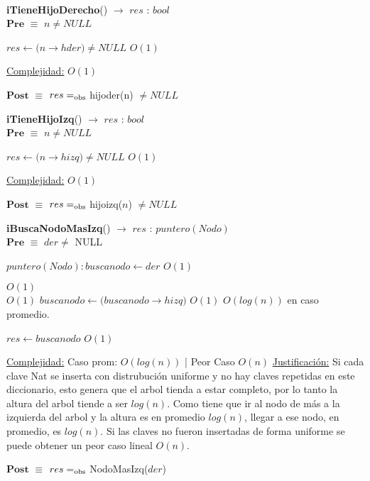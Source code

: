 ~


\begin{algorithm}[H]{\textbf{iTieneHijoDerecho}() $\to$ $res$ : $bool$}
	{\\ $\textbf{Pre}$ $\equiv$ $n \neq NULL$}
	\begin{algorithmic}[1]

		\State $res \gets (n$$\rightarrow$$hder) \neq NULL$ \Comment $O(1)$

		\medskip
		\Statex \underline{Complejidad:} $O(1)$

    \end{algorithmic}
    {$\textbf{Post}$ $\equiv$ $res =_{\mathrm{obs}}$ hijoder(n) $\neq NULL$}
\end{algorithm}


\begin{algorithm}[H]{\textbf{iTieneHijoIzq}() $\to$ $res$ : $bool$}
	{\\ $\textbf{Pre}$ $\equiv$ $n \neq NULL$}
	\begin{algorithmic}[1]

		\State $res \gets (n$$\rightarrow$$hizq) \neq NULL$ \Comment $O(1)$

		\medskip
		\Statex \underline{Complejidad:} $O(1)$

    \end{algorithmic}
    {$\textbf{Post}$ $\equiv$ $res =_{\mathrm{obs}}$ hijoizq($n$) $\neq NULL$}
\end{algorithm}


\begin{algorithm}[H]{\textbf{iBuscaNodoMasIzq}() $\to$ $res$ : $puntero(Nodo)$}
	{\\ $\textbf{Pre}$ $\equiv$ $der \neq$ NULL}
	\begin{algorithmic}[1]

		\State $puntero(Nodo): buscanodo \gets der$ \Comment $O(1)$

		 \Comment $O(1)$
		\\
			 \Comment $O(1)$
				\State $buscanodo \gets (buscanodo$$\rightarrow$$hizq)$ \Comment $O(1)$
			\EndWhile \Comment $O(log(n))$ en caso promedio.

		\EndIf

		\State $res \gets buscanodo$ \Comment $O(1)$

		\medskip
		\Statex \underline{Complejidad:} Caso prom: $O(log(n))$ | Peor Caso $O(n)$
		\Statex \underline{Justificación:} Si cada clave Nat se inserta con distrubución uniforme y no hay claves repetidas en este diccionario, esto genera que el arbol tienda a estar completo, por lo tanto la altura del arbol tiende a ser $log(n)$. Como tiene que ir al nodo de más a la izquierda del arbol y la altura es en promedio $log(n)$, llegar a ese nodo, en promedio, es $log(n)$. Si las claves no fueron insertadas de forma uniforme se puede obtener un peor caso lineal $O(n)$.

    \end{algorithmic}
    {$\textbf{Post}$ $\equiv$ $res =_{\mathrm{obs}}$ NodoMasIzq($der$)}
\end{algorithm}

